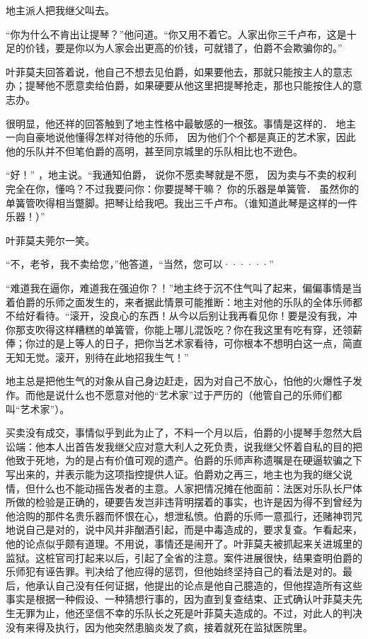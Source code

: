 \documentclass[12pt, UTF8]{ctexbook}
\begin{document}
\par 地主派人把我继父叫去。
\par “你为什么不肯出让提琴？”他问道。“你又用不着它。人家出你三千卢布，这是十足的价钱，要是你以为人家会出更高的价钱，可就错了，伯爵不会欺骗你的。”
\par 叶菲莫夫回答着说，他自己不想去见伯爵，如果要他去，那就只能按主人的意志办；提琴他不愿意卖给伯爵，如果硬要从他这里把提琴抢走，那也只能按住人的意志办。
\par 很明显，他还祥的回答触到了地主性格中最敏感的一根弦。事情是这样的． 地主一向自豪地说他懂得怎样对待他的乐师， 因为他们个个都是真正的艺术家，因此他的乐队并不但笔伯爵的高明，甚至同京城里的乐队相比也不逊色。
\par“好！” ，地主说。“我通知伯爵， 说你不愿卖琴就是不愿， 因为卖与不卖的权利完全在你，懂呜？不过我要问你：你要提琴干嘛？ 你的乐器是单簧管． 虽然你的单簧管吹得相当蹩脚。把琴让给我吧。我出三千卢布。（谁知道此琴是这样的一件乐器！）”
\par 叶菲莫夫莞尔一笑。
\par “不，老爷，我不卖给您，”他答道，“当然，您可以······”
\par “难道我在逼你，难道我在强迫你？！”地主终于沉不住气叫了起来，偏偏事情是当着伯爵的乐师之面发生的，来者据此情景可能推断：地主对他的乐队的全体乐师都不给好看待。“滚开，没良心的东西！从今以后别让我再看见你！要是没有我，冲你那支吹得这样糟糕的单簧管，你能上哪儿混饭吃？你在我这里有吃有穿，还领薪俸；你过的是上等人的日子，把你当艺术家看待，可你根本不想明白这一点，简直无知无觉。滚开，别待在此地招我生气！”
\par 地主总是把他生气的对象从自己身边赶走，因为对自己不放心，怕他的火爆性子发作。而他是说什么也不愿意对他的“艺术家”过于严历的（他管自己的乐师们都叫“艺术家”）。
\par 买卖没有成交，事情似乎到此为止了，不料一个月以后，伯爵的小提琴手忽然大启讼端：他本人出首告发我继父应对意大利人之死负责，说我继父怀着自私的目的把他致于死地，为的是占有价值可观的遗产。伯爵的乐师声称遗嘱是在硬逼软骗之下写出来的，并表示能为这项指控提供人证。伯爵劝之再三，地主也为我的继父说情，但什么也不能动摇告发者的主意。人家把情况摊在他面前：法医对乐队长尸体所做的检验是正确的，硬要告发岂非违背明摆着的事实，也许是因为得不到曾经为他洽购的那件名贵乐器而怀恨在心，想泄私愤。伯爵的乐师一意孤行，还赌神罚咒地说自己是对的，说中风并非酗酒引起，而是中毒造成的，要求复查。乍看起来，他的论点似乎颇有道理。不用说，事情还是闹开了。叶菲莫夫被抓起来关进城里的监狱。这桩官司打起来以后，引起了全省的注意。案件进展很快，结果查明伯爵的乐师犯有诬告罪。判决给了他应得的惩罚，但他始终坚持自己的看法是对的。最后，他承认自己没有任何证据，他提出的论点是他自己臆造的，但他捏造所有这些事实是根据一种假设、一种猜想行事的，因为直到复查结束、正式确认叶菲莫夫先生无罪为止，他还坚信不幸的乐队长之死是叶菲莫夫造成的。不过，对此人的判决没有来得及执行，因为他突然患脑炎发了疯，接着就死在监狱医院里。
\end{document}
